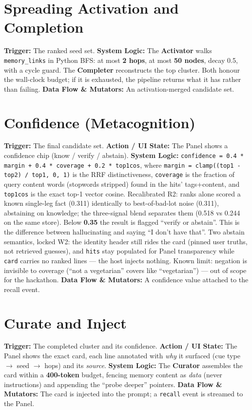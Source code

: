 \section{Spreading Activation and Completion}
\textbf{Trigger:} The ranked seed set.
\textbf{System Logic:} The \textbf{Activator} walks \texttt{memory\_links} in Python BFS: at most
\textbf{2 hops}, at most \textbf{50 nodes}, decay 0.5, with a cycle guard. The \textbf{Completer}
reconstructs the top cluster. Both honour the wall-clock budget; if it is exhausted, the pipeline
returns what it has rather than failing.
\textbf{Data Flow \& Mutators:} An activation-merged candidate set.

\section{Confidence (Metacognition)}
\textbf{Trigger:} The final candidate set.
\textbf{Action / UI State:} The Panel shows a confidence chip (know / verify / abstain).
\textbf{System Logic:} \texttt{confidence = 0.4 * margin + 0.4 * coverage + 0.2 * top1cos},
where \texttt{margin = clamp((top1 - top2) / top1, 0, 1)} is the RRF distinctiveness,
\texttt{coverage} is the fraction of query content words (stopwords stripped) found in the
hits' tags+content, and \texttt{top1cos} is the exact top-1 vector cosine. Recalibrated R2:
ranks alone scored a known single-leg fact (0.311) identically to best-of-bad-lot noise
(0.311), abstaining on knowledge; the three-signal blend separates them (0.518 vs 0.244 on the
same store). Below \textbf{0.35} the result is flagged ``verify or abstain''. This is the
difference between hallucinating and saying ``I don't have that''. Two abstain semantics,
locked W2: the identity header still rides the card (pinned user truths, not retrieved
guesses), and \texttt{hits} stay populated for Panel transparency while \texttt{card} carries
no ranked lines --- the host injects nothing. Known limit: negation is invisible to coverage
(``not a vegetarian'' covers like ``vegetarian'') --- out of scope for the hackathon.
\textbf{Data Flow \& Mutators:} A confidence value attached to the recall event.

\section{Curate and Inject}
\textbf{Trigger:} The completed cluster and its confidence.
\textbf{Action / UI State:} The Panel shows the exact card, each line annotated with \emph{why} it
surfaced (cue type $\rightarrow$ seed $\rightarrow$ hops) and its \emph{source}.
\textbf{System Logic:} The \textbf{Curator} assembles the card within a \textbf{400-token} budget,
fencing memory content as \emph{data} (never instructions) and appending the ``probe deeper'' pointers.
\textbf{Data Flow \& Mutators:} The card is injected into the prompt; a \texttt{recall} event is
streamed to the Panel.

